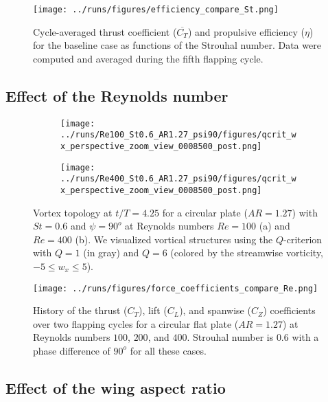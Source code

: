 \begin{figure}
  \centering
  \texttt{[image: ../runs/figures/efficiency\_compare\_St.png]}
  \caption{Cycle-averaged thrust coefficient ($\overline{C_T}$) and propulsive efficiency ($\eta$) for the baseline case as functions of the Strouhal number. Data were computed and averaged during the fifth flapping cycle.}
  \label{fig:strouhal_propulsive_efficiency}
\end{figure}

\subsection{Effect of the Reynolds number}

\begin{figure}
  \centering
  \begin{subfigure}[c]{0.45\textwidth}
    \centering
    \texttt{[image: ../runs/Re100\_St0.6\_AR1.27\_psi90/figures/qcrit\_wx\_perspective\_zoom\_view\_0008500\_post.png]}
    \caption{}
  \end{subfigure}
  \hfill
  \begin{subfigure}[c]{0.45\textwidth}
    \centering
    \texttt{[image: ../runs/Re400\_St0.6\_AR1.27\_psi90/figures/qcrit\_wx\_perspective\_zoom\_view\_0008500\_post.png]}
    \caption{}
  \end{subfigure}
  \caption{Vortex topology at $t / T = 4.25$ for a circular plate ($AR = 1.27$) with $St = 0.6$ and $\psi = 90^o$ at Reynolds numbers $Re = 100$ (a) and $Re = 400$ (b). We visualized vortical structures using the $Q$-criterion with $Q = 1$ (in gray) and $Q = 6$ (colored by the streamwise vorticity, $-5 \leq w_x \leq 5$).}
  \label{fig:reynolds_wake_topology}
\end{figure}

\begin{figure}
  \centering
  \texttt{[image: ../runs/figures/force\_coefficients\_compare\_Re.png]}
  \caption{History of the thrust ($C_T$), lift ($C_L$), and spanwise ($C_Z$) coefficients over two flapping cycles for a circular flat plate ($AR = 1.27$) at Reynolds numbers $100$, $200$, and $400$. Strouhal number is $0.6$ with a phase difference of $90^o$ for all these cases.}
  \label{fig:reynolds_force_coefficients}
\end{figure}

\subsection{Effect of the wing aspect ratio}

